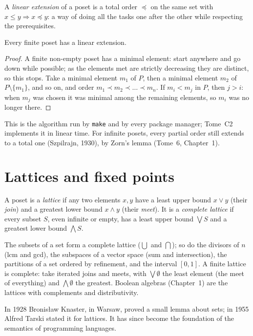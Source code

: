 A \emph{linear extension} of a poset is a total order $\preceq$ on the same set with $x\le y\Rightarrow x\preceq y$: a way of doing all the tasks one
after the other while respecting the prerequisites.

\begin{proposition}\label{prop:topsort}
Every finite poset has a linear extension.
\end{proposition}
\begin{proof}
A finite non-empty poset has a minimal element: start anywhere and go down while possible; as the elements met are
strictly decreasing they are distinct, so this stops. Take a minimal element $m_1$ of $P$, then a minimal element $m_2$ of
$P\setminus\{m_1\}$, and so on, and order $m_1\prec m_2\prec\dots\prec m_n$. If $m_i<m_j$ in $P$, then $j>i$: when $m_j$ was chosen it was minimal among the
remaining elements, so $m_i$ was no longer there.
\end{proof}

This is the algorithm run by \texttt{make} and by every package manager; Tome~C2 implements it in linear time. For infinite
posets, every partial order still extends to a total one (Szpilrajn, 1930), by Zorn's lemma (Tome~6, Chapter~1).

\section{Lattices and fixed points}

\begin{definition}\label{def:lattice}
A poset is a \emph{lattice} if any two elements $x,y$ have a least upper bound $x\lor y$ (their \emph{join}) and a greatest lower bound
$x\land y$ (their \emph{meet}). It is a \emph{complete lattice} if every subset $S$, even infinite or empty, has a least upper bound $\bigvee S$
and a greatest lower bound $\bigwedge S$.
\end{definition}

The subsets of a set form a complete lattice ($\bigcup$ and $\bigcap$); so do the divisors of $n$ (lcm and gcd), the subspaces of a
vector space (sum and intersection), the partitions of a set ordered by refinement, and the interval $[0,1]$. A finite
lattice is complete: take iterated joins and meets, with $\bigvee\emptyset$ the least element (the meet of everything) and $\bigwedge\emptyset$ the
greatest. Boolean algebras (Chapter~1) are the lattices with complements and distributivity.

In 1928 Bronis\l aw Knaster, in Warsaw, proved a small lemma about sets; in 1955 Alfred Tarski stated it for lattices.
It has since become the foundation of the semantics of programming languages.

